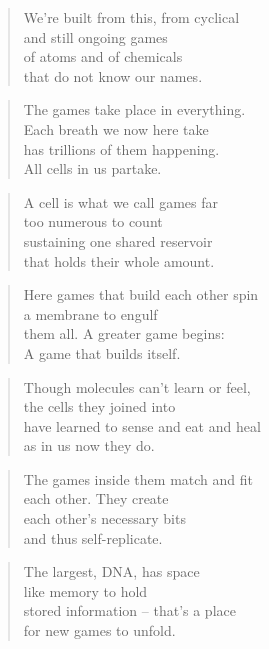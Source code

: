 \documentclass[10pt,a4paper]{article}
\begin{document}
\begin{multicols}{2}
\begin{verse}
We’re built from this, from cyclical\\
and still ongoing games\\
of atoms and of chemicals\\
that do not know our names.
\end{verse}

\begin{verse}
The games take place in everything.\\
Each breath we now here take\\
has trillions of them happening.\\
All cells in us partake.
\end{verse}

\begin{verse}
A cell is what we call games far\\
too numerous to count\\
sustaining one shared reservoir\\
that holds their whole amount.
\end{verse}

\begin{verse}
Here games that build each other spin\\
a membrane to engulf\\
them all. A greater game begins:\\
A game that builds itself.
\end{verse}

\begin{verse}
Though molecules can’t learn or feel,\\
the cells they joined into\\
have learned to sense and eat and heal\\
as in us now they do.
\end{verse}

\begin{verse}
The games inside them match and fit\\
each other. They create\\
each other’s necessary bits\\
and thus self-replicate.
\end{verse}

\begin{verse}
The largest, DNA, has space\\
like memory to hold\\
stored information – that’s a place\\
for new games to unfold.
\end{verse}


\end{multicols}
\end{document}
